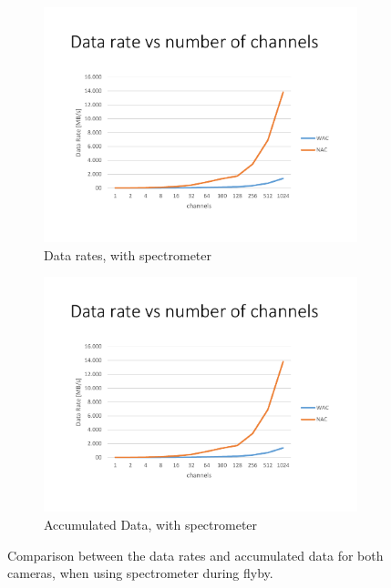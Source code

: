 \begin{figure}[h!]
    \centering
    \begin{subfigure}[b]{0.48\textwidth}
        \includegraphics[width=\textwidth,page=6,trim=15mm 15mm 15mm 32mm,clip]{figures/Orbiter/Graphs_excel.pdf}
        \caption{Data rates, with spectrometer}\label{fig:data_gen_wac_compare_spec}
    \end{subfigure}
    \begin{subfigure}[b]{0.48\textwidth}
        \includegraphics[width=\textwidth,page=7,trim=15mm 15mm 15mm 32mm,clip]{figures/Orbiter/Graphs_excel.pdf}
        \caption{Accumulated Data, with spectrometer}\label{fig:data_gen_nac_compare_spec}
    \end{subfigure}
    \caption{Comparison between the data rates and accumulated data for both cameras, when using spectrometer during flyby.}\label{fig:data_gen_wac_nac_compare2}
\end{figure}
